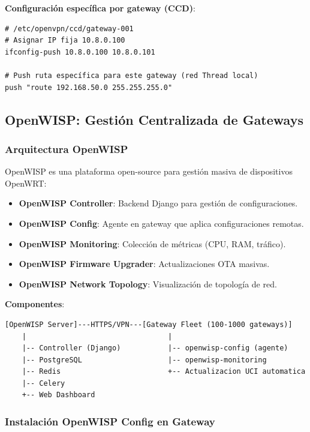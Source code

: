 \textbf{Configuración específica por gateway (CCD)}:
\begin{verbatim}
# /etc/openvpn/ccd/gateway-001
# Asignar IP fija 10.8.0.100
ifconfig-push 10.8.0.100 10.8.0.101

# Push ruta específica para este gateway (red Thread local)
push "route 192.168.50.0 255.255.255.0"
\end{verbatim}

\subsection{OpenWISP: Gestión Centralizada de Gateways}

\subsubsection{Arquitectura OpenWISP}

OpenWISP es una plataforma open-source para gestión masiva de dispositivos OpenWRT:

\begin{itemize}
    \item \textbf{OpenWISP Controller}: Backend Django para gestión de configuraciones.
    \item \textbf{OpenWISP Config}: Agente en gateway que aplica configuraciones remotas.
    \item \textbf{OpenWISP Monitoring}: Colección de métricas (CPU, RAM, tráfico).
    \item \textbf{OpenWISP Firmware Upgrader}: Actualizaciones OTA masivas.
    \item \textbf{OpenWISP Network Topology}: Visualización de topología de red.
\end{itemize}

\textbf{Componentes}:
\begin{verbatim}
[OpenWISP Server]---HTTPS/VPN---[Gateway Fleet (100-1000 gateways)]
    |                                 |
    |-- Controller (Django)           |-- openwisp-config (agente)
    |-- PostgreSQL                    |-- openwisp-monitoring
    |-- Redis                         +-- Actualizacion UCI automatica
    |-- Celery
    +-- Web Dashboard
\end{verbatim}

\subsubsection{Instalación OpenWISP Config en Gateway}

